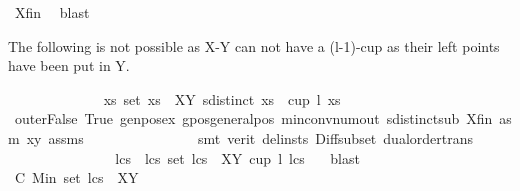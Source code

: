 \begin{isabellebody}
\ X{\isacharunderscore}{\kern0pt}fin\ \isamarkupfalse%
\ blast%
\begin{isamarkuptext}%
The following is not possible as X-Y can not have a (l-1)-cup as their left points have been put in Y.%
\end{isamarkuptext}\isamarkuptrue%
\ \ \ \ \ \ \ \ \ \ \ \ \isamarkupfalse%
\ {\isachardoublequoteopen}{\isasymexists}xs{\isachardot}{\kern0pt}\ set\ xs\ {\isasymsubseteq}\ {\isacharparenleft}{\kern0pt}X{\isacharminus}{\kern0pt}Y{\isacharparenright}{\kern0pt}{\isasymand}\ sdistinct\ xs\ {\isasymand}\ cup\ {\isacharparenleft}{\kern0pt}l{\isacharminus}{\kern0pt}{}{\isacharparenright}{\kern0pt}\ xs{\isachardoublequoteclose}\isanewline
\ \ \ \ \ \ \ \ \ \ \ \ \ \ \isamarkupfalse%
\ outerFalse\ True\ genpos{\isacharunderscore}{\kern0pt}ex\ gpos{\isacharunderscore}{\kern0pt}generalpos\ min{\isacharunderscore}{\kern0pt}conv{\isacharunderscore}{\kern0pt}num{\isacharunderscore}{\kern0pt}out\ sdistinct{\isacharunderscore}{\kern0pt}sub\ X{\isacharunderscore}{\kern0pt}fin\ asm{\isacharparenleft}{\kern0pt}{}{\isacharparenright}{\kern0pt}\ xy{}\ assms{\isacharparenleft}{\kern0pt}{}{\isacharparenright}{\kern0pt}\isanewline
\ \ \ \ \ \ \ \ \ \ \ \ \ \ \isamarkupfalse%
\ {\isacharparenleft}{\kern0pt}smt\ {\isacharparenleft}{\kern0pt}verit{\isacharcomma}{\kern0pt}\ del{\isacharunderscore}{\kern0pt}insts{\isacharparenright}{\kern0pt}\ Diff{\isacharunderscore}{\kern0pt}subset\ dual{\isacharunderscore}{\kern0pt}order{\isachardot}{\kern0pt}trans{\isacharparenright}{\kern0pt}\isanewline
\ \ \ \ \ \ \ \ \ \ \ \ \isamarkupfalse%
\ \isamarkupfalse%
\ lcs\ \ lcs{\isacharcolon}{\kern0pt}\ {\isachardoublequoteopen}set\ lcs\ {\isasymsubseteq}\ {\isacharparenleft}{\kern0pt}X{\isacharminus}{\kern0pt}Y{\isacharparenright}{\kern0pt}{\isachardoublequoteclose}\ {\isachardoublequoteopen}cup\ {\isacharparenleft}{\kern0pt}l{\isacharminus}{\kern0pt}{}{\isacharparenright}{\kern0pt}\ lcs{\isachardoublequoteclose}\ \ \isamarkupfalse%
\ blast\isanewline
\ \ \ \ \ \ \ \ \ \ \ \ \isamarkupfalse%
\ C{}{\isacharcolon}{\kern0pt}\ {\isachardoublequoteopen}Min\ {\isacharparenleft}{\kern0pt}set\ lcs{\isacharparenright}{\kern0pt}\ {\isasymin}\ {\isacharparenleft}{\kern0pt}X{\isacharminus}{\kern0pt}Y{\isacharparenright}{\kern0pt}{\isachardoublequoteclose}\isanewline
\ \ \ \ \ \ \ \ \ \ \ \ \ \ \isamarkupfalse%

\end{isabellebody}
